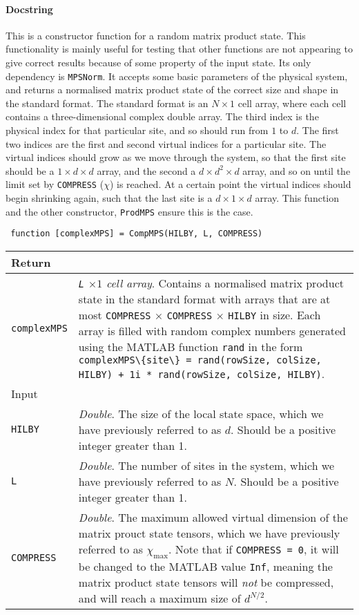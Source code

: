  \paragraph{Docstring}
 This is a constructor function for a random matrix product state. This functionality is mainly useful for testing that other functions are not appearing to give correct results because of some property of the input state. Its only dependency is \lstinline$MPSNorm$. It accepts some basic parameters of the physical system, and returns a normalised matrix product state of the correct size and shape in the standard format. The standard format is an \(N \times 1\) cell array, where each cell contains a three-dimensional complex double array. The third index is the physical index for that particular site, and so should run from \(1\) to \(d\). The first two indices are the first and second virtual indices for a particular site. The virtual indices should grow as we move through the system, so that the first site should be a \(1 \times d \times d\) array, and the second a \(d \times d^{2} \times d\) array, and so on until the limit set by \lstinline$COMPRESS$ (\(\chi\)) is reached. At a certain point the virtual indices should begin shrinking again, such that the last site is a \(d \times 1 \times d\) array. This function and the other constructor, \lstinline$ProdMPS$ ensure this is the case.  
 \begin{lstlisting}
 function [complexMPS] = CompMPS(HILBY, L, COMPRESS) \end{lstlisting}
 \begin{longtabu}{X[1,l]X[4,l]}
 \hline
 Return & \\ \hline
 \lstinline$complexMPS$ & \emph{\lstinline$L$ \(\times 1\) cell array}. Contains a normalised matrix product state in the standard format with arrays that are at most \lstinline$COMPRESS$ \(\times\) \lstinline$COMPRESS$ \(\times\) \lstinline$HILBY$ in size. Each array is filled with random complex numbers generated using the MATLAB function \lstinline$rand$ in the form \lstinline$complexMPS\{site\} = rand(rowSize, colSize, HILBY) + 1i * rand(rowSize, colSize, HILBY)$. \\ \hline
 Input & \\ \hline
 \lstinline$HILBY$ & \emph{Double}. The size of the local state space, which we have previously referred to as \(d\). Should be a positive integer greater than 1.  \\
 \lstinline$L$ & \emph{Double}. The number of sites in the system, which we have previously referred to as \(N\). Should be a positive integer greater than 1. \\
 \lstinline$COMPRESS$ & \emph{Double}. The maximum allowed virtual dimension of the matrix prouct state tensors, which we have previously referred to as \(\chi_{\mathrm{max}}\). Note that if \lstinline$COMPRESS = 0$, it will be changed to the MATLAB value \lstinline$Inf$, meaning the matrix product state tensors will \emph{not} be compressed, and will reach a maximum size of \(d^{N/2}\).  \\
 \hline
 \end{longtabu}
